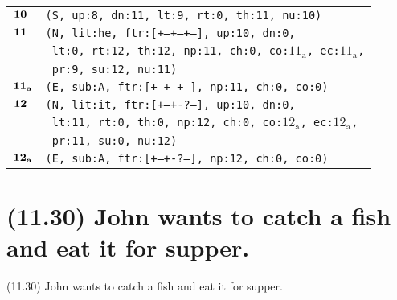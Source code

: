 \documentclass{article}
\begin{document}
\begin{minipage}{\textwidth}
{\begin{tabular}{|r|l|}
    ${\textbf{\textrm{10}}_{\phantom{z}}}$ & \texttt{\texttt{(S,~up:8,~dn:11,~lt:9,~rt:0,~th:11,~nu:10)}} \\
    ${\textbf{\textrm{11}}_{\phantom{z}}}$ & \texttt{\texttt{(N,~lit:he,~ftr:[+--+--+--],~up:10,~dn:0,}} \\
    & \texttt{\texttt{~lt:0,~rt:12,~th:12,~np:11,~ch:0,~co:${\textrm{11}_{\textrm{a}}}$,~ec:${\textrm{11}_{\textrm{a}}}$,}} \\
    & \texttt{\texttt{~pr:9,~su:12,~nu:11)}} \\
    ${\textbf{\textrm{11}}_{\textbf{\textrm{a}}}}$ & \texttt{\texttt{(E,~sub:A,~ftr:[+--+--+--],~np:11,~ch:0,~co:0)}} \\
    ${\textbf{\textrm{12}}_{\phantom{z}}}$ & \texttt{\texttt{(N,~lit:it,~ftr:[+--+-?---],~up:10,~dn:0,}} \\
    & \texttt{\texttt{~lt:11,~rt:0,~th:0,~np:12,~ch:0,~co:${\textrm{12}_{\textrm{a}}}$,~ec:${\textrm{12}_{\textrm{a}}}$,}} \\
    & \texttt{\texttt{~pr:11,~su:0,~nu:12)}} \\
    ${\textbf{\textrm{12}}_{\textbf{\textrm{a}}}}$ & \texttt{\texttt{(E,~sub:A,~ftr:[+--+-?---],~np:12,~ch:0,~co:0)}} \\
    \hline
  \end{tabular}
  }
\end{minipage}
\bigbreak

\clearpage

%
%

\section*{(11.30) John wants to catch a fish and eat it for supper.}

\bigbreak
\begin{enumerate*}
\item[(11.30)] John wants to catch a fish and eat it for supper.
\end{enumerate*}
\bigbreak
\end{document}
